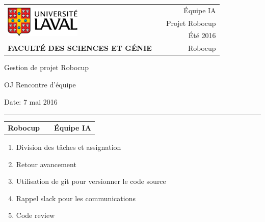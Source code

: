 \documentclass[12pt,letterpaper,twoside]{article}
\begin{document}
\setcounter{secnumdepth}{0}
\begin{titlepage}

	\vspace*{1cm}
	\begin{small}
		\begin{tabularx}{\textwidth}{ l X r }
			\multirow{3}{*}{\includegraphics[height=1.5cm,keepaspectratio]{ul_logo.pdf}}
			&& \'Equipe IA\\
   && Projet Robocup\\
   && Été 2016\\

			\scriptsize{\textbf{FACULTÉ DES SCIENCES ET GÉNIE}} && Robocup
		\end{tabularx}
	\end{small}

	\vfill

	\begin{center}

		Gestion de projet Robocup

		\vspace{0.5cm}

		OJ Rencontre d'\'equipe

		\vspace{2cm}

	\end{center}

	\vfill

	Date: 7 mai 2016

	\vspace{0.4cm}

	\rule{\textwidth}{2pt}

	\vspace{0.3cm}

	\begin{tabularx}{\textwidth}{ l X r }

		\textbf{Robocup} && \textbf{\'Equipe IA} \\

	\end{tabularx}


\end{titlepage}

\begin{enumerate}
	\item Division des tâches et assignation
	\item Retour avancement
	\item Utilisation de git pour versionner le code source
	\item Rappel slack pour les communications
    \item Code review
\end{enumerate}
\end{document}
